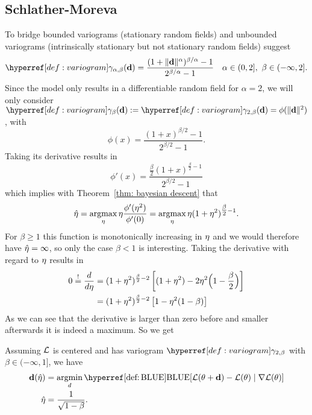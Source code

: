 
\subsection{Schlather-Moreva}

To bridge bounded variograms (stationary random fields) and
unbounded variograms (intrinsically stationary but not stationary random fields)
\textcite{schlatherParametricModelBridging2017} suggest
\begin{equation*}
	\variogram_{\alpha,\beta}(\step)
	= \frac{(1+\|\step\|^\alpha)^{\beta/\alpha}-1}{2^{\beta/\alpha}-1}
	\quad \alpha\in (0,2],\ \beta\in(-\infty, 2].
\end{equation*}
Since the model only results in a differentiable random field for \(\alpha=2\),
we will only consider \(\variogram_\beta(\step) := \variogram_{2,\beta}(\step) = \phi(\|\step\|^2)\),
with
\begin{equation*}
	\phi(x) = \frac{(1+x)^{\beta/2} -1}{2^{\beta/2}-1}.
\end{equation*}
Taking its derivative results in
\begin{equation*}
	\phi'(x) = \frac{\tfrac\beta2 (1+x)^{\tfrac\beta2 -1}}{2^{\beta/2}-1}
\end{equation*}
which implies with Theorem~\ref{thm: bayesian descent} that
\begin{align*}
	\hat{\eta} = \operatorname*{argmax}_\eta \eta\frac{\phi'(\eta^2)}{\phi'(0)}
	= \operatorname*{argmax}_\eta \eta(1+\eta^2)^{\tfrac\beta2 -1}.
\end{align*}
For \(\beta \ge 1\) this function is monotonically increasing in \(\eta\) and
we would therefore have \(\hat{\eta} = \infty\), so only the case \(\beta <1\)
is interesting. Taking the derivative with regard to
\(\eta\) results in
\begin{align*}
	0 \overset!=\frac{d}{d\eta}
	&= (1+\eta^2)^{\frac\beta2 -2} \left[(1+\eta^2) - 2\eta^2\Big(1-\frac\beta2\Big)\right]\\
	&= (1+\eta^2)^{\frac\beta2 -2} \left[1 - \eta^2(1-\beta)\right]
\end{align*}
As we can see that the derivative is larger than zero before and smaller
afterwards it is indeed a maximum.
So we get
\begin{theorem}
	Assuming \(\mathcal{L}\) is centered and has variogram \(\variogram_{2,\beta}\)
	with \(\beta\in(-\infty, 1]\), we have
	\begin{align*}
		\step(\hat{\lr})
		&= \argmin_{d}
		\BLUE[\Loss(\param + \step) - \Loss(\param)\mid \grad\Loss(\param)]\\
		\hat{\lr}
		&= \frac1{\sqrt{1-\beta}}.
	\end{align*}
\end{theorem}

